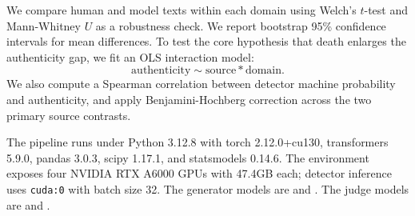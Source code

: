 We compare human and model texts within each domain using Welch's $t$-test and Mann-Whitney $U$ as a robustness check. We report bootstrap 95\% confidence intervals for mean differences. To test the core hypothesis that death enlarges the authenticity gap, we fit an OLS interaction model:
\[
\text{authenticity} \sim \text{source} * \text{domain}.
\]
We also compute a Spearman correlation between detector machine probability and authenticity, and apply Benjamini-Hochberg correction across the two primary source contrasts.

The pipeline runs under Python 3.12.8 with torch 2.12.0+cu130, transformers 5.9.0, pandas 3.0.3, scipy 1.17.1, and statsmodels 0.14.6. The environment exposes four NVIDIA RTX A6000 GPUs with 47.4GB each; detector inference uses \texttt{cuda:0} with batch size 32. The generator models are \gptfive and \claudesonnet. The judge models are \gptjudge and \claudejudge.
